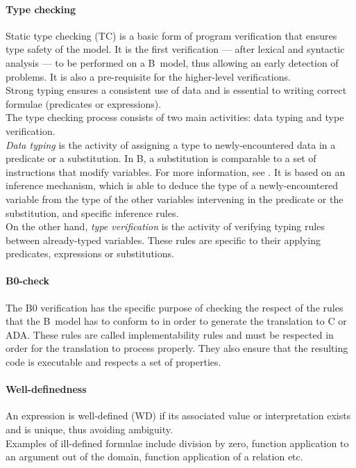 \paragraph{Type checking}
Static type checking (TC) is a basic form of program verification that ensures type safety of the model. It is the first verification --- after lexical and syntactic analysis --- to be performed on a B~model, thus allowing an early detection of problems. It is also a pre-requisite for the higher-level verifications. \\
Strong typing ensures a consistent use of data and is essential to writing correct formulae (predicates or expressions).\\

The type checking process consists of two main activities: data typing and type verification.\\
{\itshape Data typing} is the activity of assigning a type to newly-encountered data in a predicate or a substitution. {In B, a substitution is comparable to a set of instructions that modify variables. For more information, see \cite{bbook}}. It is based on an inference mechanism, which is able to deduce the type of a newly-encountered variable from the type of the other variables intervening in the predicate or the substitution, and specific inference rules.\\
On the other hand, {\itshape type verification} is the activity of verifying typing rules between already-typed variables. These rules are specific to their applying predicates, expressions or substitutions.

\paragraph{B0-check}
The B0 verification has the specific purpose of checking the respect of the rules that the B~model has to conform to in order to generate the translation to C or ADA. These rules are called implementability rules and must be respected in order for the translation to process properly. They also ensure that the resulting code is executable and respects a set of properties.

\paragraph{Well-definedness}
An expression is well-defined (WD) if its associated value or interpretation exists and is unique, thus avoiding ambiguity.\\
Examples of ill-defined formulae include division by zero, function application to an argument out of the domain, function application of a relation etc.\\

